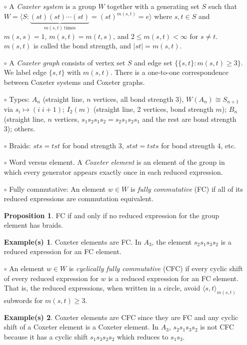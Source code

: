 \documentclass{article}
\newcommand{\gen}[1]{\langle #1 \rangle}
\providecommand{\abs}[1]{\left\lvert#1\right\rvert}
\theoremstyle{definition}
\newtheorem*{ex}{Example(s)}
\theoremstyle{theorem}
\newtheorem*{prop}{Proposition}
\begin{document}
\begin{itemize}
	\item[$\circ$] A \emph{Coxeter system} is a group $W$ together with a generating set $S$ such that $W = \gen{S : \underbrace{(st)(st) \cdots (st)}_{m(s,t) ~\text{times}} = (st)^{m(s,t)} = e}$ where $s,t \in S$ and $m(s,s) = 1$, $m(s,t) = m(t,s)$, and $2 \leq m(s,t) < \infty$ for $s \neq t$. $m(s,t)$ is called the bond strength, and $\abs{st} = m(s,t)$.
	
	\item[$\circ$] A \emph{Coxeter graph} consists of vertex set $S$ and edge set $\{\{s,t\} : m(s,t) \geq 3\}$. We label edge $\{s,t\}$ with $m(s,t)$. There is a one-to-one correspondence between Coxeter systems and Coxeter graphs.
	
	\item[$\circ$] Types: $A_n$ (straight line, $n$ vertices, all bond strength 3), $W(A_n) \cong S_{n+1}$ via $s_i \mapsto (i \; i+1)$; $I_2(m)$ (straight line, 2 vertices, bond strength $m$); $B_n$ (straight line, $n$ vertices, $s_1s_2s_1s_2 = s_2s_1s_2s_1$ and the rest are bond strength 3); others.
	
		\item[$\circ$] Braids: $sts = tst$ for bond strength 3, $stst = tsts$ for bond strength 4, etc.
	
	\item[$\circ$] Word versus element. A \emph{Coxeter element} is an element of the group in which every generator appears exactly once in each reduced expression.
	
	\item[$\circ$] Fully commutative: An element $w \in W$ is \emph{fully commutative} (FC) if all of its reduced expressions are commutation equivalent.
	\begin{prop} FC if and only if no reduced expression for the group element has braids. \end{prop}
	\begin{ex} Coxeter elements are FC. In $A_3$, the element $s_2s_1s_3s_2$ is a reduced expression for an FC element. \end{ex}
	
	\item[$\circ$] An element $w \in W$ is \emph{cyclically fully commutative} (CFC) if every cyclic shift of every reduced expression for $w$ is a reduced expression for an FC element. That is, the reduced expressions, when written in a circle, avoid $\gen{s,t}_{m(s,t)}$ subwords for $m(s,t) \geq 3$.
	\begin{ex} Coxeter elements are CFC since they are FC and any cyclic shift of a Coxeter element is a Coxeter element. In $A_3$, $s_2s_1s_3s_2$ is not CFC because it has a cyclic shift $s_1s_3s_2s_2$ which reduces to $s_1s_3$.
	 \end{ex}
	

\end{itemize}
\end{document}
